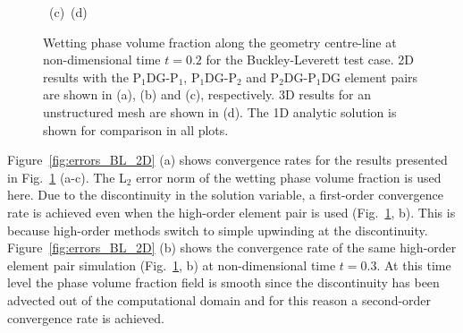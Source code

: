 \documentclass[times]{fldauth}
\newcommand{\PN}[2][error]{P$_{#1}$DG-P$_{#2}$}
\begin{document}
\begin{figure}[h!]
\begin{center}
{      \hbox{
        \vspace{-0.cm}\hbox{\hspace{3.0cm}(c)} 
        \vspace{-0.cm}\hbox{\hspace{6.0cm}(d)}}}
    \caption{Wetting phase volume fraction along the geometry
      centre-line at non-dimensional time $t=0.2$ for the
      Buckley-Leverett test case. 2D results with the \PN[1]{1},
      \PN[1]{2} and \PN[2]{1}DG element pairs are shown in (a), (b)
      and (c), respectively. 3D results for an unstructured mesh are
      shown in (d). The 1D analytic solution is shown for comparison
      in all plots.\label{fig:BL_tests}}
  \end{center}
\end{figure}

Figure~\ref{fig:errors_BL_2D} (a) shows convergence rates for the
results presented in Fig.~\ref{fig:BL_tests} (a-c). The
L$_2$ error norm of the wetting phase volume fraction is used
here. Due to the discontinuity in the solution variable, a
first-order convergence rate is achieved even when the high-order
element pair is used (Fig.~\ref{fig:BL_tests}, b). This is because
high-order methods switch to simple upwinding at the discontinuity.
Figure~\ref{fig:errors_BL_2D} (b) shows the convergence rate of the same
high-order element pair simulation (Fig.~\ref{fig:BL_tests}, b) at
non-dimensional time $t=0.3$. At this time level the phase volume
fraction field is smooth since the discontinuity has been advected out
of the computational domain and for this reason a second-order
convergence rate is achieved.
\end{document}
